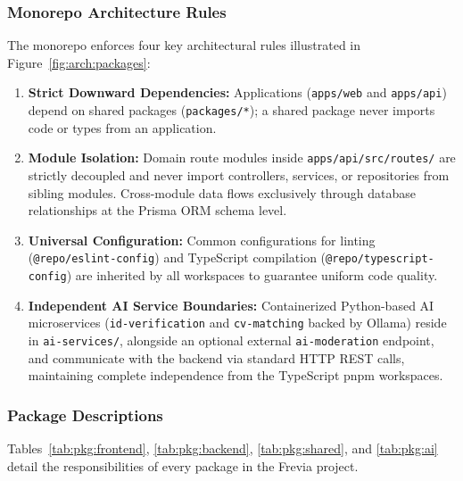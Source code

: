 \subsubsection*{Monorepo Architecture Rules}
The monorepo enforces four key architectural rules illustrated in Figure~\ref{fig:arch:packages}:
\begin{enumerate}[leftmargin=*]
    \item \textbf{Strict Downward Dependencies:} Applications (\texttt{apps/web} and \texttt{apps/api}) depend on shared packages (\texttt{packages/*}); a shared package never imports code or types from an application.
    \item \textbf{Module Isolation:} Domain route modules inside \texttt{apps/api/src/routes/} are strictly decoupled and never import controllers, services, or repositories from sibling modules. Cross-module data flows exclusively through database relationships at the Prisma ORM schema level.
    \item \textbf{Universal Configuration:} Common configurations for linting (\texttt{@repo/eslint-config}) and TypeScript compilation (\texttt{@repo/typescript-config}) are inherited by all workspaces to guarantee uniform code quality.
    \item \textbf{Independent AI Service Boundaries:} Containerized Python-based AI microservices (\texttt{id-\allowbreak{}verification} and \texttt{cv-\allowbreak{}matching} backed by Ollama) reside in \texttt{ai-services/}, alongside an optional external \texttt{ai-\allowbreak{}moderation} endpoint, and communicate with the backend via standard HTTP REST calls, maintaining complete independence from the TypeScript pnpm workspaces.
\end{enumerate}

\subsubsection*{Package Descriptions}
Tables~\ref{tab:pkg:frontend}, \ref{tab:pkg:backend}, \ref{tab:pkg:shared}, and \ref{tab:pkg:ai} detail the responsibilities of every package in the Frevia project.

